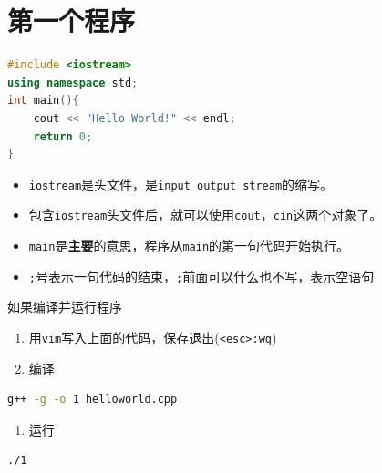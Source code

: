\documentclass[
  paper=a4,
  ,captions=tableheading
]{scrbook}
\newcommand{\passthrough}[1]{#1}
\providecommand{\tightlist}{%
  \setlength{\itemsep}{0pt}\setlength{\parskip}{0pt}}
\begin{document}



{
\setcounter{tocdepth}{1}
\tableofcontents
\newpage
}
\hypertarget{ux7b2cux4e00ux4e2aux7a0bux5e8f}{%
\section{第一个程序}\label{ux7b2cux4e00ux4e2aux7a0bux5e8f}}

\begin{lstlisting}[language={C++}]
#include <iostream>
using namespace std;
int main(){
    cout << "Hello World!" << endl;
    return 0;
}
\end{lstlisting}

\begin{itemize}
\tightlist
\item
  \passthrough{\lstinline!iostream!}是头文件，是\passthrough{\lstinline!input output stream!}的缩写。
\item
  包含\passthrough{\lstinline!iostream!}头文件后，就可以使用\passthrough{\lstinline!cout!}，\passthrough{\lstinline!cin!}这两个对象了。
\item
  \passthrough{\lstinline!main!}是\textbf{主要}的意思，程序从\passthrough{\lstinline!main!}的第一句代码开始执行。
\item
  \passthrough{\lstinline!;!}号表示一句代码的结束，\passthrough{\lstinline!;!}前面可以什么也不写，表示空语句
\end{itemize}

如果编译并运行程序

\begin{enumerate}
\def\labelenumi{\arabic{enumi}.}
\tightlist
\item
  用\passthrough{\lstinline!vim!}写入上面的代码，保存退出(\passthrough{\lstinline!<esc>:wq!})
\item
  编译
\end{enumerate}

\begin{lstlisting}[language=bash]
g++ -g -o 1 helloworld.cpp
\end{lstlisting}

\begin{enumerate}
\def\labelenumi{\arabic{enumi}.}
\setcounter{enumi}{2}
\tightlist
\item
  运行
\end{enumerate}

\begin{lstlisting}[language=bash]
./1
\end{lstlisting}
\end{document}
